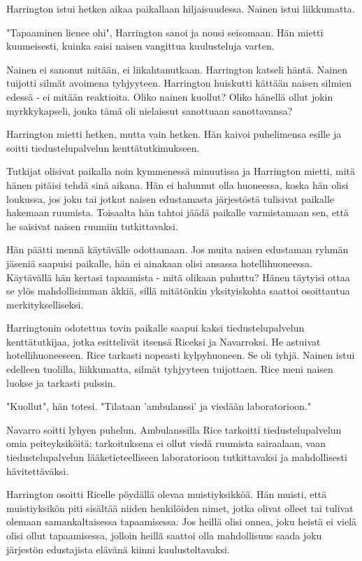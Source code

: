 Harrington istui hetken aikaa paikallaan hiljaisuudessa. Nainen istui liikkumatta.


"Tapaaminen lienee ohi", Harrington sanoi ja nousi seisomaan. Hän mietti kuumeisesti, kuinka saisi naisen vangittua kuulusteluja varten.


Nainen ei sanonut mitään, ei liikahtanutkaan. Harrington katseli häntä. Nainen tuijotti silmät avoimena tyhjyyteen. Harrington huiskutti kättään naisen silmien edessä - ei mitään reaktioita. Oliko nainen kuollut? Oliko hänellä ollut jokin myrkkykapseli, jonka tämä oli nielaissut sanottuaan sanottavansa?


Harrington mietti hetken, mutta vain hetken. Hän kaivoi puhelimensa esille ja soitti tiedustelupalvelun kenttätutkimukseen.




\psep Tutkijat olisivat paikalla noin kymmenessä minuutissa ja Harrington mietti, mitä hänen pitäisi tehdä sinä aikana. Hän ei halunnut olla huoneessa, koska hän olisi loukussa, jos joku tai jotkut naisen edustamasta järjestöstä tulisivat paikalle hakemaan ruumista. Toisaalta hän tahtoi jäädä paikalle varmistamaan sen, että he saisivat naisen ruumiin tutkittavaksi.


Hän päätti mennä käytävälle odottamaan. Jos muita naisen edustaman ryhmän jäseniä saapuisi paikalle, hän ei ainakaan olisi ansassa hotellihuoneessa. Käytävällä hän kertasi tapaamista - mitä olikaan puhuttu? Hänen täytyisi ottaa se ylös mahdollisimman äkkiä, sillä mitätönkin yksityiskohta saattoi osoittautua merkitykselliseksi.




\psep Harringtonin odotettua tovin paikalle saapui kaksi tiedustelupalvelun kenttätutkijaa, jotka esittelivät itsensä Riceksi ja Navarroksi. He astuivat hotellihuoneeseen. Rice tarkasti nopeasti kylpyhuoneen. Se oli tyhjä. Nainen istui edelleen tuolilla, liikkumatta, silmät tyhjyyteen tuijottaen. Rice meni naisen luokse ja tarkasti pulssin.


"Kuollut", hän totesi. "Tilataan 'ambulanssi' ja viedään laboratorioon."


Navarro soitti lyhyen puhelun. Ambulanssilla Rice tarkoitti tiedustelupalvelun omia peiteyksiköitä; tarkoituksena ei ollut viedä ruumista sairaalaan, vaan tiedustelupalvelun lääketieteelliseen laboratorioon tutkittavaksi ja mahdollisesti hävitettäväksi.


Harrington osoitti Ricelle pöydällä olevaa muistiyksikköä. Hän muisti, että muistiyksikön piti sisältää niiden henkilöiden nimet, jotka olivat olleet tai tulivat olemaan samankaltaisessa tapaamisessa. Jos heillä olisi onnea, joku heistä ei vielä olisi ollut tapaamisessa, jolloin heillä saattoi olla mahdollisuus saada joku järjestön edustajista elävänä kiinni kuulusteltavaksi.


